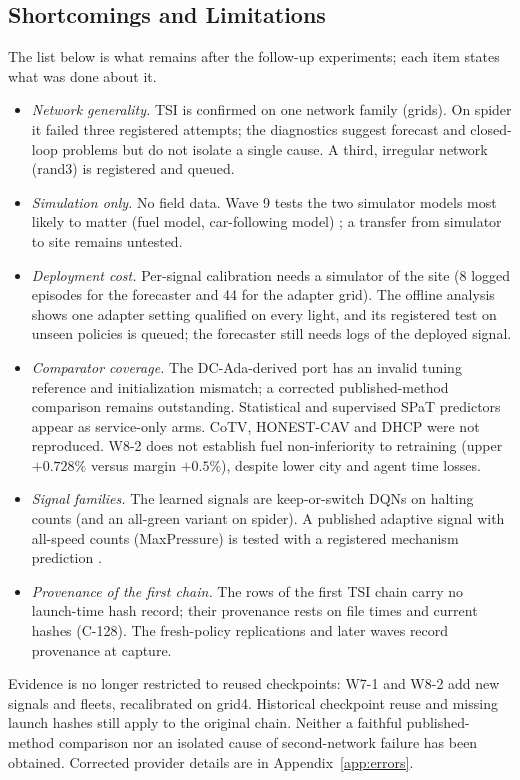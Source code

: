 \subsection{Shortcomings and Limitations}
The list below is what remains after the follow-up experiments; each item states what was done about it.
\begin{itemize}\setlength\itemsep{1pt}
\item \emph{Network generality.} TSI is confirmed on one network family (grids). On spider it failed three registered attempts; the
diagnostics suggest forecast and closed-loop problems but do not isolate a single cause. A third, irregular network
(rand3) is registered and queued.
\item \emph{Simulation only.} No field data. Wave 9 tests the two simulator models most likely to matter (fuel model, car-following model)
; a transfer from simulator to site remains untested.
\item \emph{Deployment cost.} Per-signal calibration needs a simulator of the site (8 logged episodes for the forecaster and 44 for the
adapter grid). The offline analysis shows one adapter setting qualified on every light, and its registered test on unseen policies is
queued; the forecaster still needs logs of the deployed signal.
\item \emph{Comparator coverage.} The DC-Ada-derived port has an invalid tuning reference and initialization mismatch; a corrected published-method comparison remains outstanding. Statistical and supervised SPaT predictors appear as service-only arms. CoTV, HONEST-CAV and DHCP were not reproduced. W8-2 does not establish fuel non-inferiority to retraining (upper $+0.728\%$ versus margin $+0.5\%$), despite lower city and agent time losses.
\item \emph{Signal families.} The learned signals are keep-or-switch DQNs on halting counts (and an all-green variant on spider). A
published adaptive signal with all-speed counts (MaxPressure) is tested with a registered mechanism prediction .
\item \emph{Provenance of the first chain.} The rows of the first TSI chain carry no launch-time hash record; their provenance rests on file
times and current hashes (C-128). The fresh-policy replications and later waves record provenance at capture.
\end{itemize}
Evidence is no longer restricted to reused checkpoints: W7-1 and W8-2 add new signals and fleets, recalibrated on grid4. Historical checkpoint reuse and missing launch hashes still apply to the original chain. Neither a faithful published-method comparison nor an isolated cause of second-network failure has been obtained. Corrected provider details are in Appendix~\ref{app:errors}.

